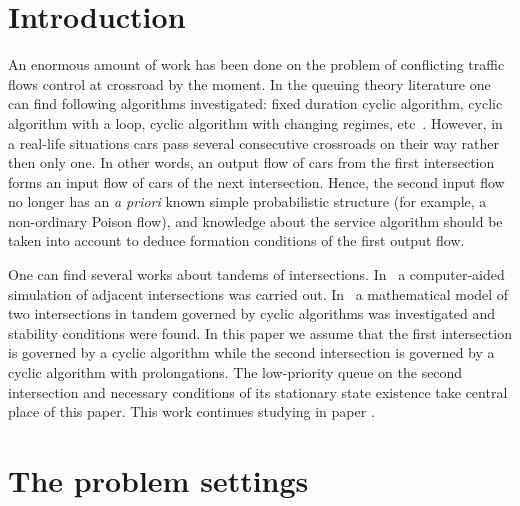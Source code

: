 \documentclass[runningheads,a4paper]{llncs}
\begin{document}
\section{Introduction}
An enormous amount of work has been done on the problem of conflicting traffic flows control at crossroad by the moment. In the queuing theory literature one can find following algorithms investigated: fixed duration cyclic algorithm, cyclic algorithm with a loop, cyclic algorithm with changing regimes, etc~\cite{n:f:p:1968,f:1977,f:1977-1,l:f:2000,p:f:2008,a:b:2010}. However, in a real-life situations cars pass several consecutive crossroads on their way rather then only one. In other words, an output flow of cars from
the first intersection forms an input flow of cars of the next intersection. Hence, the second input flow
no longer has an \textit{a priori} known simple probabilistic structure (for example, a
non-ordinary Poison flow), and knowledge about the service algorithm should be taken into account to deduce formation conditions of the first output flow.

One can find several works about tandems of intersections. In~\cite{y:l:1985} a computer-aided
simulation of adjacent intersections was carried out. In~\cite{z:2012} a mathematical model of two intersections in tandem governed by cyclic algorithms was investigated and stability conditions were found. In this paper we assume that the first intersection is governed by a cyclic algorithm while the second intersection is governed by a cyclic algorithm with prolongations. The low-priority queue on the second intersection and necessary conditions of its stationary state existence take central place of this paper. This work continues studying in paper \cite{k:z:2016}.

\section{The  problem settings}
\end{document}
